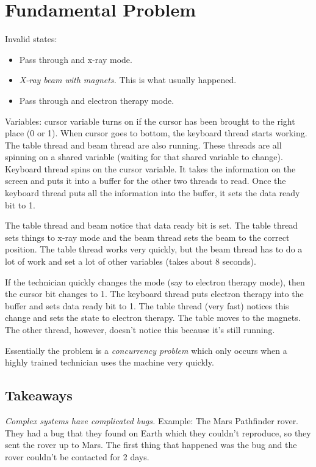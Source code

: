 \documentclass[psamsfonts]{amsart}
\begin{document}
\section{Fundamental Problem}

Invalid states:

\begin{itemize}
\item Pass through and x-ray mode.
\item \emph{X-ray beam with magnets.} This is what usually happened.
\item Pass through and electron therapy mode.
\end{itemize}

Variables: cursor variable turns on if the cursor has been brought to the right place (0 or 1). When cursor goes to bottom, the keyboard thread starts working. The table thread and beam thread are also running. These threads are all spinning on a shared variable (waiting for that shared variable to change). Keyboard thread spins on the cursor variable. It takes the information on the screen and puts it into a buffer for the other two threads to read.  Once the keyboard thread puts all the information into the buffer, it sets the data ready bit to 1. 

The table thread and beam notice that data ready bit is set. The table thread sets things to x-ray mode and the beam thread sets the beam to the correct position. The table thread works very quickly, but the beam thread has to do a lot of work and set a lot of other variables (takes about 8 seconds). 

If the technician quickly changes the mode (say to electron therapy mode), then the cursor bit changes to 1. The keyboard thread puts electron therapy into the buffer and sets data ready bit to 1. The table thread (very fast) notices this change and sets the state to electron therapy. The table moves to the magnets. The other thread, however, doesn't notice this because it's still running. 

Essentially the problem is a \emph{concurrency problem} which only occurs when a highly trained technician uses the machine very quickly. 

\subsection{Takeaways}

\emph{Complex systems have complicated bugs.} Example: The Mars Pathfinder rover. They had a bug that they found on Earth which they couldn't reproduce, so they sent the rover up to Mars. The first thing that happened was the bug and the rover couldn't be contacted for 2 days.
\end{document}
